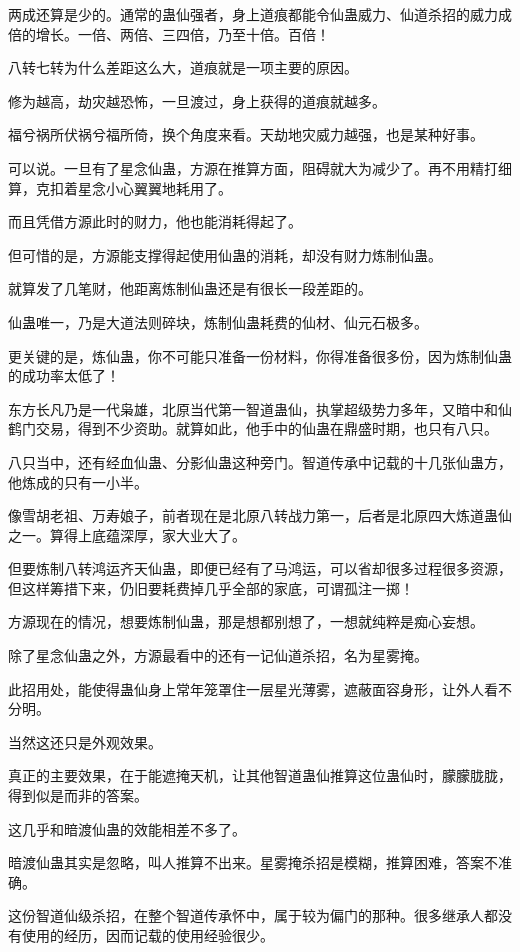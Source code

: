 \begin{this_body}
两成还算是少的。通常的蛊仙强者，身上道痕都能令仙蛊威力、仙道杀招的威力成倍的增长。一倍、两倍、三四倍，乃至十倍。百倍！

八转七转为什么差距这么大，道痕就是一项主要的原因。

修为越高，劫灾越恐怖，一旦渡过，身上获得的道痕就越多。

福兮祸所伏祸兮福所倚，换个角度来看。天劫地灾威力越强，也是某种好事。

可以说。一旦有了星念仙蛊，方源在推算方面，阻碍就大为减少了。再不用精打细算，克扣着星念小心翼翼地耗用了。

而且凭借方源此时的财力，他也能消耗得起了。

但可惜的是，方源能支撑得起使用仙蛊的消耗，却没有财力炼制仙蛊。

就算发了几笔财，他距离炼制仙蛊还是有很长一段差距的。

仙蛊唯一，乃是大道法则碎块，炼制仙蛊耗费的仙材、仙元石极多。

更关键的是，炼仙蛊，你不可能只准备一份材料，你得准备很多份，因为炼制仙蛊的成功率太低了！

东方长凡乃是一代枭雄，北原当代第一智道蛊仙，执掌超级势力多年，又暗中和仙鹤门交易，得到不少资助。就算如此，他手中的仙蛊在鼎盛时期，也只有八只。

八只当中，还有经血仙蛊、分影仙蛊这种旁门。智道传承中记载的十几张仙蛊方，他炼成的只有一小半。

像雪胡老祖、万寿娘子，前者现在是北原八转战力第一，后者是北原四大炼道蛊仙之一。算得上底蕴深厚，家大业大了。

但要炼制八转鸿运齐天仙蛊，即便已经有了马鸿运，可以省却很多过程很多资源，但这样筹措下来，仍旧要耗费掉几乎全部的家底，可谓孤注一掷！

方源现在的情况，想要炼制仙蛊，那是想都别想了，一想就纯粹是痴心妄想。

除了星念仙蛊之外，方源最看中的还有一记仙道杀招，名为星雾掩。

此招用处，能使得蛊仙身上常年笼罩住一层星光薄雾，遮蔽面容身形，让外人看不分明。

当然这还只是外观效果。

真正的主要效果，在于能遮掩天机，让其他智道蛊仙推算这位蛊仙时，朦朦胧胧，得到似是而非的答案。

这几乎和暗渡仙蛊的效能相差不多了。

暗渡仙蛊其实是忽略，叫人推算不出来。星雾掩杀招是模糊，推算困难，答案不准确。

这份智道仙级杀招，在整个智道传承怀中，属于较为偏门的那种。很多继承人都没有使用的经历，因而记载的使用经验很少。


\end{this_body}

